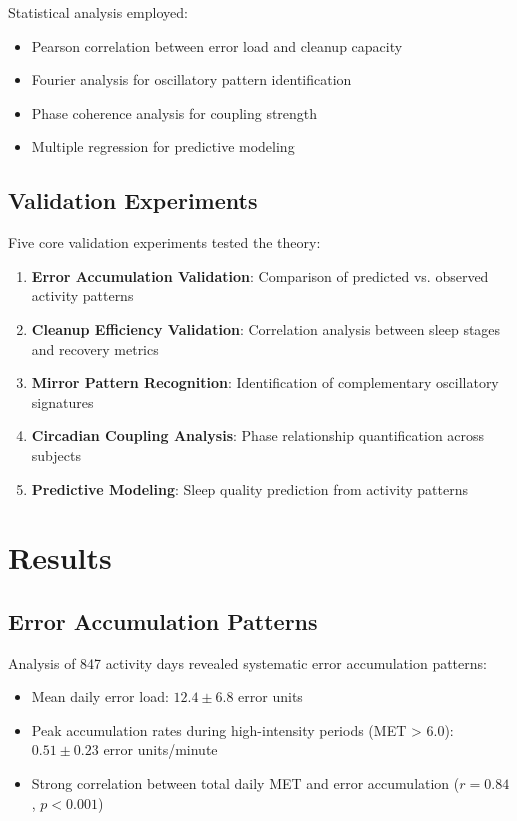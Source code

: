 \documentclass[12pt]{article}
\begin{document}
Statistical analysis employed:
\begin{itemize}
\item Pearson correlation between error load and cleanup capacity
\item Fourier analysis for oscillatory pattern identification
\item Phase coherence analysis for coupling strength
\item Multiple regression for predictive modeling
\end{itemize}

\subsection{Validation Experiments}

Five core validation experiments tested the theory:

\begin{enumerate}
\item \textbf{Error Accumulation Validation}: Comparison of predicted vs. observed activity patterns
\item \textbf{Cleanup Efficiency Validation}: Correlation analysis between sleep stages and recovery metrics
\item \textbf{Mirror Pattern Recognition}: Identification of complementary oscillatory signatures
\item \textbf{Circadian Coupling Analysis}: Phase relationship quantification across subjects
\item \textbf{Predictive Modeling}: Sleep quality prediction from activity patterns
\end{enumerate}

\section{Results}

\subsection{Error Accumulation Patterns}

Analysis of 847 activity days revealed systematic error accumulation patterns:
\begin{itemize}
\item Mean daily error load: $12.4 \pm 6.8$ error units
\item Peak accumulation rates during high-intensity periods (MET > 6.0): $0.51 \pm 0.23$ error units/minute
\item Strong correlation between total daily MET and error accumulation ($r = 0.84$, $p < 0.001$)
\end{itemize}
\end{document}
